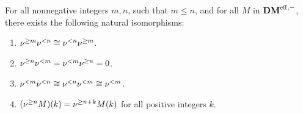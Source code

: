 \begin{prop}\label{prop_sDM_properties}
For all nonnegative integers $m, n$, such that $m \leq n$, and
for all $M$ in $\DMeff$, there exists the following natural
isomorphisms:

\begin{enumerate}
\item $\sgDM{m}\slDM{n} \cong \slDM{n}\sgDM{m}$.

\item $\sgDM{n}\slDM{m} = \slDM{m}\sgDM{n} = 0$.

\item $\slDM{m}\slDM{n} \cong \slDM{n}\slDM{m} \cong \slDM{m}$.

\item $\tZ[k]{(\sgDM{n}M)} = \sgDM{n + k}\tZ[k]{M}$ for all 
positive integers $k$.

\end{enumerate}
\end{prop}
